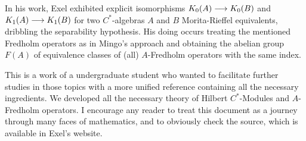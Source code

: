 In his work, Exel exhibited explicit isomorphisms $K_0(A)\longrightarrow K_0(B)$ and $K_1(A)\longrightarrow K_1(B)$ for two $C^*$-algebras $A$ and $B$ Morita-Rieffel equivalents, dribbling the separability hypothesis. His doing occurs treating the mentioned Fredholm operators as in Mingo's approach \cite{mingo1987K} and obtaining the abelian group $F(A)$ of equivalence classes of (all) $A$-Fredholm operators with the same index. 

This is a work of a undergraduate student who wanted to facilitate further studies in those topics with a more unified reference containing all the necessary ingredients. We developed all the necessary theory of Hilbert $C^*$-Modules and $A$-Fredholm operators. I encourage any reader to treat this document as a journey through many faces of mathematics, and to obviously check the source, which is available in Exel's website. 

